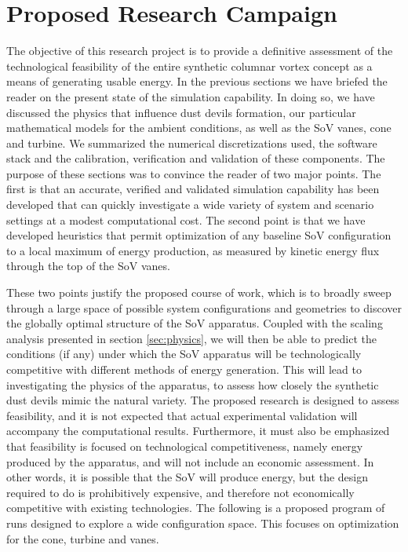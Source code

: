 \section{Proposed Research Campaign}
\label{sec:proposed_work}


The objective of this research project is to provide a definitive
assessment of the technological feasibility of the entire synthetic
columnar vortex concept as a means of generating usable energy. In the 
previous sections we have briefed the reader on the present state of the
simulation capability. In doing so, we have discussed the physics that
influence dust devils formation, our particular mathematical
models for the ambient conditions, as well as the SoV vanes, cone and
turbine. We summarized the numerical discretizations used, the software
stack and the calibration, verification and validation of these
components. The purpose of these sections was to convince the reader of
two major points. The first is that an accurate, verified and
validated simulation capability has been developed that can quickly
investigate a wide variety of system and scenario settings at a modest
computational cost. The second point is that we have developed
heuristics that permit optimization of any baseline SoV configuration to
a local maximum of energy production, as measured by kinetic energy flux
through the top of the SoV vanes.  

These two points justify the proposed course of work, which is to
broadly sweep through a large space of possible system configurations
and geometries to discover the globally optimal structure
of the SoV apparatus. Coupled with the scaling analysis presented in
section \ref{sec:physics}, we will then be able to predict the
conditions (if any) under which the SoV apparatus will be
technologically competitive with different methods of energy
generation. This will lead to investigating the physics of the
apparatus, to assess how closely the synthetic dust devils mimic the
natural variety. The proposed research is designed to
assess feasibility, and it is not expected that actual experimental
validation will accompany the computational results. Furthermore, it
must also be emphasized that feasibility is focused on
technological competitiveness, namely energy produced by the apparatus,
and will not include an economic assessment. In other words, it is
possible that the SoV will produce energy, but the design required to do
is prohibitively expensive, and therefore not economically competitive
with existing technologies. The following is a proposed program of runs 
designed to explore a wide configuration space. This focuses on
optimization for the cone, turbine and vanes. 


